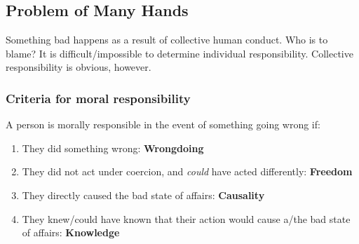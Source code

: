 \documentclass{article}
\begin{document}
    \subsection{Problem of Many Hands}
    Something bad happens as a result of collective human conduct. Who is to blame? It is difficult/impossible to determine individual responsibility. Collective responsibility is obvious, however.
        \subsubsection{Criteria for moral responsibility}
        A person is morally responsible in the event of something going wrong if:
        \begin{enumerate}
            \item They did something wrong: \textbf{Wrongdoing}
            \item They did not act under coercion, and \textit{could} have acted differently: \textbf{Freedom}
            \item They directly caused the bad state of affairs: \textbf{Causality}
            \item They knew/could have known that their action would cause a/the bad state of affairs: \textbf{Knowledge}
        \end{enumerate}{}
        
\end{document}
